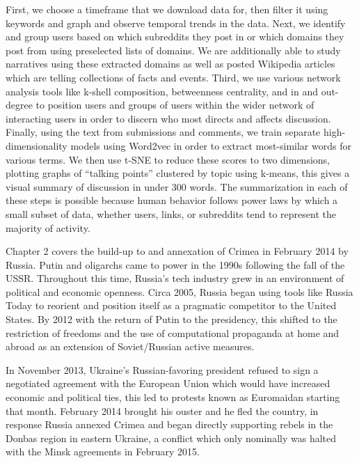 \documentclass[doublespacing]{utdthesis}
\begin{document}
First, we choose a timeframe that we download data for, then filter it using keywords and graph and observe temporal trends in the data.
Next, we identify and group users based on which subreddits they post in or which domains they post from using preselected lists of domains.
We are additionally able to study narratives using these extracted domains as well as posted Wikipedia articles which are telling collections of facts and events.
Third, we use various network analysis tools like k-shell composition, betweenness centrality, and in and out-degree to position users and groups of users within the wider network of interacting users in order to discern who most directs and affects discussion.
Finally, using the text from submissions and comments, we train separate high-dimensionality models using Word2vec in order to extract most-similar words for various terms.
We then use t-SNE to reduce these scores to two dimensions, plotting graphs of ``talking points'' clustered by topic using k-means, this gives a visual summary of discussion in under 300 words. 
The summarization in each of these steps is possible because human behavior follows power laws by which a small subset of data, whether users, links, or subreddits tend to represent the majority of activity.
 
Chapter 2 covers the build-up to and annexation of Crimea in February 2014 by Russia.
Putin and oligarchs came to power in the 1990s following the fall of the USSR.
Throughout this time, Russia's tech industry grew in an environment of political and economic openness.
Circa 2005, Russia began using tools like Russia Today to reorient and position itself as a pragmatic competitor to the United States.
By 2012 with the return of Putin to the presidency, this shifted to the restriction of freedoms and the use of computational propaganda at home and abroad as an extension of Soviet/Russian active measures.

In November 2013, Ukraine's Russian-favoring president refused to sign a negotiated agreement with the European Union which would have increased economic and political ties, this led to protests known as Euromaidan starting that month.
February 2014 brought his ouster and he fled the country, in response Russia annexed Crimea and began directly supporting rebels in the Donbas region in eastern Ukraine, a conflict which only nominally was halted with the Minsk agreements in February 2015.
\end{document}

